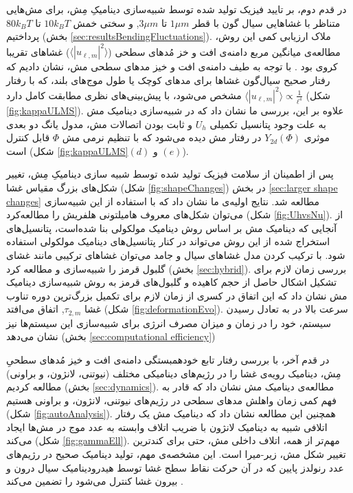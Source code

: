 در قدم دوم، بر تایید فیزیک تولید شده  توسط شبیه‌سازی دینامیکِ مِش، برای مش‌هایی متناظر با غشاهایی سیال گون با قطر 
$1 \mu m$
تا
$3 \mu m$,
و سختی خمش 
$10 k_BT$
تا
$80 k_BT$
پرداختیم (بخش
\ref{sec:resultsBendingFluctuations}).
ملاک ارزیابی کمی این روش، مطالعه‌ی میانگین مربع دامنه‌ی افت و خز مُد‌های سطحی
($\langle|u_{\ell,m}|^2\rangle$)
 غشا‌های تقریبا کروی بود
\cite{milnersafranPRA1987, gomppernelson2012}.
با توجه به طیف دامنه‌ی افت و خیز مد‌های سطحی مش، نشان دادیم که رفتار صحیح سیال‌گون غشا‌ها برای مد‌های کوچک یا طول موج‌های بلند، که با رفتار 
 $\langle|u_{\ell,m}|^2\rangle\propto \frac{1}{\ell^4}$
مشخص می‌شود، با پیش‌بینی‌های نظری مطابقت کامل دارد (شکل
\ref{fig:kappaULMS}).
 علاوه بر این، بررسی ما نشان داد که در شبیه‌سازی دینامیک مش به علت وجود پتانسیل تکمیلی
$U_h$
و ثابت بودن اتصالات مش، مدول یانگ دو بعدی موثری 
$Y_{2d}(\Phi)$
در رفتار مش دیده‌ می‌شود که با تنظیم نرمی مش
 $\Phi$ 
قابل کنترل است (شکل
\ref{fig:kappaULMS}$(d)$
و
$(e)$).

پس از اطمینان از سلامت فیزیک تولید شده توسط شبیه‌ سازی دینامیکِ مِش، تغییر شکل‌های بزرگ مقیاس غشا (شکل
\ref{fig:shapeChanges})
در بخش 
\ref{sec:larger shape changes}
مطالعه‌ شد. نتایج اولیه‌ی ما نشان داد که با استفاده از این شبیه‌سازی می‌توان شکل‌های معروف هامیلتونی هلفریش را مطالعه‌کرد (شکل
\ref{fig:UhvsNu}).
از آنجایی که دینامیک مش بر اساس روش دینامیک مولکولی بنا شده‌است، پتانسیل‌های استخراج شده از این روش می‌تواند در کنار پتانسیل‌های دینامیک مولکولی استفاده شود. با ترکیب کردن مدل غشا‌های سیال و جامد می‌توان غشا‌های ترکیبی مانند غشای گلبول قرمز را شبیه‌سازی و مطالعه کرد (بخش 
\ref{sec:hybrid}).
بررسی زمان لازم برای تشکیل اشکال حاصل از حجم کاهیده و گلبول‌های قرمز به روش شبیه‌سازی دینامیک مش نشان داد که این اتفاق در کسری از  زمان لازم برای تکمیل بزرگ‌ترین دوره تناوب غشا
$\tau_{2,m}$,
اتفاق می‌افتد (شکل
\ref{fig:deformationEvo}).
 سرعت بالا در به تعادل رسیدن سیستم، خود را در زمان و میزان مصرف انرژی برای  شبیه‌سازی‌ این سیستم‌ها نیز نشان می‌دهد (بخش 
\ref{sec:computational efficiency})

در قدم آخر،  با بررسی رفتار تابع خودهمبستگی دامنه‌ی افت و خیز‌ مُدهای سطحیِ مِش‌،  دینامیک رویه‌ی غشا را در رژیم‌های دینامیکی مختلف (نیوتنی، لانژون، و براونی) مطالعه کردیم (بخش
\ref{sec:dynamics}).
مطالعه‌ی دینامیک مش نشان داد که قادر به فهم کمی زمان واهلش مد‌های سطحی در رژیم‌های نیوتنی، لانژون، و براونی هستیم (شکل
\ref{fig:autoAnalysis}).
 همچنین این مطالعه نشان داد که دینامیک مش یک رفتار اتلافی شبیه‌ به دینامیک لانژون با ضریب اتلاف وابسته به عدد موج در مش‌ها ایجاد می‌کند (شکل
 \ref{fig:gammaEll}).
  مهم‌تر از همه، اتلاف داخلی مش، حتی برای کند‌ترین تغییر شکل مش، زیر-میرا است. این مشخصه‌ی مهم، تولید دینامیک صحیح در رژیم‌های عدد رنولدز پایین که در آن حرکت نقاط سطح غشا توسط هیدرودینامیک سیال درون و بیرون غشا کنترل می‌شود را تضمین می‌کند
\cite{schneider1984,milnersafranPRA1987}.

